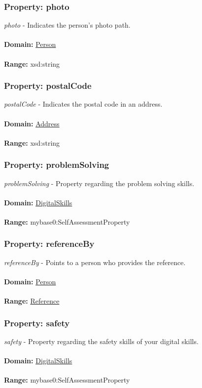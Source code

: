 \documentclass[a4paper,12pt]{article}
\numberwithin{equation}{section}
\begin{document}
\subsubsection{Property: photo}\hypertarget{photo}{}
\textit{photo} - Indicates the person's photo path.
\\\\
\textbf{Domain:} \hyperlink{Person}{Person} 
\\\\
\textbf{Range:}  xsd:string

\subsubsection{Property: postalCode}\hypertarget{postalCode}{}
\textit{postalCode} - Indicates the postal code in an address.
\\\\
\textbf{Domain:} \hyperlink{Address}{Address} 
\\\\
\textbf{Range:}  xsd:string

\subsubsection{Property: problemSolving}\hypertarget{problemSolving}{}
\textit{problemSolving} - Property regarding the problem solving skills.
\\\\
\textbf{Domain:} \hyperlink{DigitalSkills}{DigitalSkills} 
\\\\
\textbf{Range:}  mybase0:SelfAssessmentProperty

\subsubsection{Property: referenceBy}\hypertarget{referenceBy}{}
\textit{referenceBy} - Points to a person who provides the reference.
\\\\
\textbf{Domain:} \hyperlink{Person}{Person} 
\\\\
\textbf{Range:}  \hyperlink{Reference}{Reference} 

\subsubsection{Property: safety}\hypertarget{safety}{}
\textit{safety} - Property regarding the safety skills of your digital skills.
\\\\
\textbf{Domain:} \hyperlink{DigitalSkills}{DigitalSkills} 
\\\\
\textbf{Range:}  mybase0:SelfAssessmentProperty
\end{document}
